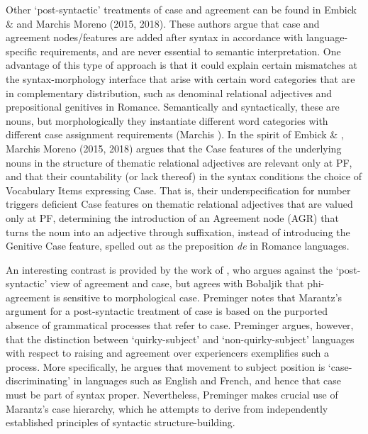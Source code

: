 \documentclass[output=paper]{langsci/langscibook}
\begin{document}
Other ‘post-syntactic’ treatments of case and agreement can be found in Embick \& \citet{Noyer2006} and Marchis Moreno (2015, 2018). These authors argue that case and agreement nodes/features are added after syntax in accordance with language-specific requirements, and are never essential to semantic interpretation. One advantage of this type of approach is that it could explain certain mismatches at the syntax-morphology interface that arise with certain word categories that are in complementary distribution, such as denominal relational adjectives and prepositional genitives in Romance. Semantically and syntactically, these are nouns, but morphologically they instantiate different word categories with different case assignment requirements (Marchis \citealt{Moreno2018}). In the spirit of Embick \& \citet{Noyer2006}, Marchis Moreno (2015, 2018) argues that the Case features of the underlying nouns in the structure of thematic relational adjectives are relevant only at PF, and that their countability (or lack thereof) in the syntax conditions the choice of Vocabulary Items expressing Case. That is, their underspecification for number triggers deficient Case features on thematic relational adjectives that are valued only at PF, determining the introduction of an Agreement node (AGR) that turns the noun into an adjective through suffixation, instead of introducing the Genitive Case feature, spelled out as the preposition \textit{de} in Romance languages. 

An interesting contrast is provided by the work of \citet{Preminger2014}, who argues against the ‘post-syntactic’ view of agreement and case, but agrees with Bobaljik that phi-agreement is sensitive to morphological case. Preminger notes that Marantz’s argument for a post-syntactic treatment of case is based on the purported absence of grammatical processes that refer to case. Preminger argues, however, that the distinction between ‘quirky-subject’ and ‘non-quirky-subject’ languages with respect to raising and agreement over experiencers exemplifies such a process. More specifically, he argues that movement to subject position is ‘case-discriminating’ in languages such as English and French, and hence that case must be part of syntax proper. Nevertheless, Preminger makes crucial use of Marantz’s case hierarchy, which he attempts to derive from independently established principles of syntactic structure-building.
\end{document}
